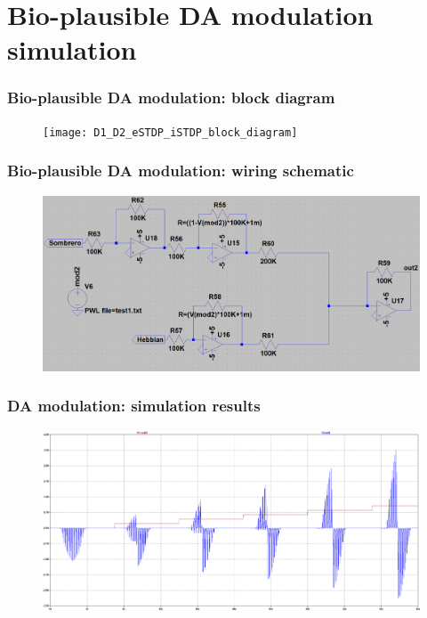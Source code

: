 \documentclass[12pt, aspectratio=169]{beamer}
\begin{document}
\section{Bio-plausible DA modulation simulation}

\begin{frame}
\frametitle{Bio-plausible DA modulation: block diagram}
\begin{figure}
\texttt{[image: D1\_D2\_eSTDP\_iSTDP\_block\_diagram]}
\end{figure}
\end{frame}


\begin{frame}
\frametitle{Bio-plausible DA modulation: wiring schematic}
\begin{figure}
\includegraphics[width=0.85\linewidth]{schematicD1}
\end{figure}
\end{frame}


\begin{frame}
\frametitle{DA modulation: simulation results}
\begin{figure}
\includegraphics[width=0.8\linewidth]{resultD1v3.png}
\end{figure}
\end{frame}
\end{document}
